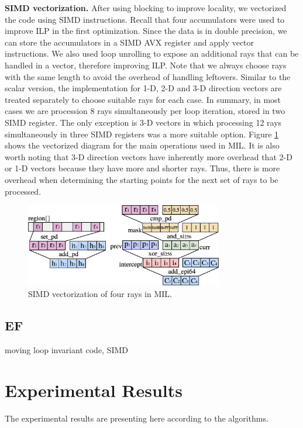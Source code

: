 \documentclass[letterpaper]{article}
\newcommand{\mypar}[1]{{\bf #1.}}
\begin{document}
\mypar{SIMD vectorization}
After using blocking to improve locality, we vectorized the code using SIMD instructions. Recall that four accumulators were used to improve ILP in the first optimization. Since the data is in double precision, we can store the accumulators in a SIMD AVX register and apply vector instructions. We also used loop unrolling to expose an additional rays that can be handled in a vector, therefore improving ILP. Note that we always choose rays with the same length to avoid the overhead of handling leftovers. Similar to the scalar version, the implementation for 1-D, 2-D and 3-D direction vectors are treated separately to choose suitable rays for each case. In summary, in most cases we are procession 8 rays simultaneously per loop iteration, stored in two SIMD register. The only exception is 3-D vectors in which processing 12 rays simultaneously in three SIMD registers was a more suitable option. 
Figure \ref{fig:simd_mil} shows the vectorized diagram for the main operations used in MIL.
It is also worth noting that 3-D direction vectors have inherently more overhead that 2-D or 1-D vectors because they have more and shorter rays. Thus, there is more overhead when determining the starting points for the next set of rays to be processed.

\begin{figure}[H]
    \centering
    \includegraphics[width=3.4in]{figs/simd_mil2.eps}
    \caption{SIMD vectorization of four rays in MIL.}
    \label{fig:simd_mil}
\end{figure}


\subsection{EF} moving loop invariant code, SIMD


\section{Experimental Results}\label{sec:exp}

The experimental results are presenting here according to the algorithms.
\end{document}
